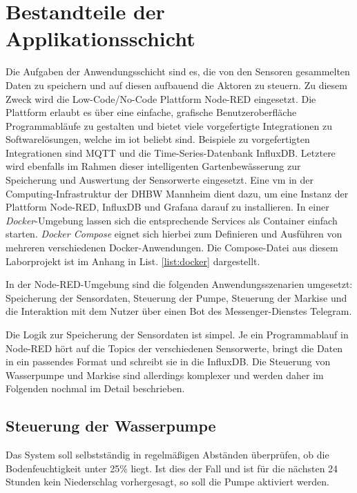 
\section{Bestandteile der Applikationsschicht}

Die Aufgaben der Anwendungsschicht sind es, die von den Sensoren gesammelten Daten zu speichern und auf diesen aufbauend die Aktoren zu steuern.
Zu diesem Zweck wird die Low-Code/No-Code Plattform Node-RED eingesetzt. Die Plattform erlaubt es über eine einfache, grafische Benutzeroberfläche Programmabläufe zu gestalten und bietet viele vorgefertigte Integrationen zu Softwarelösungen, welche im \gls{iot} beliebt sind.
Beispiele zu vorgefertigten Integrationen sind MQTT und die Time-Series-Datenbank InfluxDB.
Letztere wird ebenfalls im Rahmen dieser intelligenten Gartenbewässerung zur Speicherung und Auswertung der Sensorwerte eingesetzt. Eine \gls{vm} in der Computing-Infrastruktur der DHBW Mannheim dient dazu, um eine Instanz der Plattform Node-RED, InfluxDB und Grafana darauf zu installieren. 
In einer \textit{Docker}-Umgebung lassen sich die entsprechende Services als Container einfach starten. \textit{Docker Compose} eignet sich hierbei zum Definieren und Ausführen von mehreren verschiedenen Docker-Anwendungen. Die Compose-Datei aus diesem Laborprojekt ist im Anhang in List. \ref{list:docker} dargestellt.

In der Node-RED-Umgebung sind die folgenden Anwendungsszenarien umgesetzt: Speicherung der Sensordaten, Steuerung der Pumpe, Steuerung der Markise und die Interaktion mit dem Nutzer über einen Bot des Messenger-Dienstes Telegram. 

Die Logik zur Speicherung der Sensordaten ist simpel. 
Je ein Programmablauf in Node-RED hört auf die Topics der verschiedenen Sensorwerte, bringt die Daten in ein passendes Format und schreibt sie in die InfluxDB. 
Die Steuerung von Wasserpumpe und Markise sind allerdings komplexer und werden daher im Folgenden nochmal im Detail beschrieben.

\subsection{Steuerung der Wasserpumpe}

Das System soll selbstständig in regelmäßigen Abständen überprüfen, ob die Bodenfeuchtigkeit unter 25\% liegt.
Ist dies der Fall und ist für die nächsten 24 Stunden kein Niederschlag vorhergesagt, so soll die Pumpe aktiviert werden.

